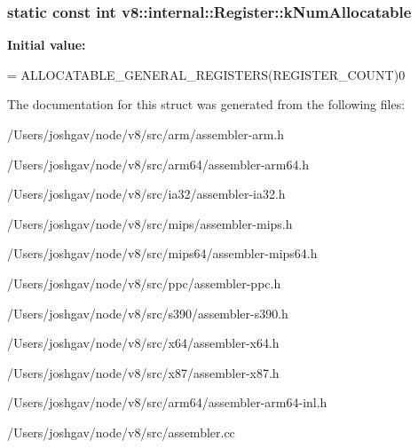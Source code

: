 \subsubsection[{\texorpdfstring{k\+Num\+Allocatable}{kNumAllocatable}}]{\setlength{\rightskip}{0pt plus 5cm}static const int v8\+::internal\+::\+Register\+::k\+Num\+Allocatable\hspace{0.3cm}{\ttfamily [static]}}\hypertarget{structv8_1_1internal_1_1_register_a042aabbf70d74eaff0002f15f48b3d8d}{}\label{structv8_1_1internal_1_1_register_a042aabbf70d74eaff0002f15f48b3d8d}
{\bfseries Initial value\+:}
\begin{DoxyCode}
=
      ALLOCATABLE\_GENERAL\_REGISTERS(REGISTER\_COUNT)0
\end{DoxyCode}


The documentation for this struct was generated from the following files\+:\begin{DoxyCompactItemize}
\item 
/\+Users/joshgav/node/v8/src/arm/assembler-\/arm.\+h\item 
/\+Users/joshgav/node/v8/src/arm64/assembler-\/arm64.\+h\item 
/\+Users/joshgav/node/v8/src/ia32/assembler-\/ia32.\+h\item 
/\+Users/joshgav/node/v8/src/mips/assembler-\/mips.\+h\item 
/\+Users/joshgav/node/v8/src/mips64/assembler-\/mips64.\+h\item 
/\+Users/joshgav/node/v8/src/ppc/assembler-\/ppc.\+h\item 
/\+Users/joshgav/node/v8/src/s390/assembler-\/s390.\+h\item 
/\+Users/joshgav/node/v8/src/x64/assembler-\/x64.\+h\item 
/\+Users/joshgav/node/v8/src/x87/assembler-\/x87.\+h\item 
/\+Users/joshgav/node/v8/src/arm64/assembler-\/arm64-\/inl.\+h\item 
/\+Users/joshgav/node/v8/src/assembler.\+cc\end{DoxyCompactItemize}
